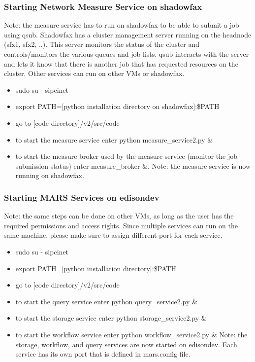 \subsubsection{Starting Network Measure Service on shadowfax}
Note: the measure service has to run on shadowfax to be able to submit a job using qsub. Shadowfax has a cluster management server running on the headnode (sfx1, sfx2, ..). This server monitors the status of the cluster and controls/monitors the various queues and job lists. qsub interacts with the server and lets it know that there is another job that has requested resources on the cluster. Other services can run on other VMs or shadowfax.
\begin{itemize}
\item sudo su - sipcinet
\item export PATH=[python installation directory on shadowfax]:\$PATH
\item go to [code directory]/v2/src/code 
\item to start the measure service enter python measure\_service2.py \&
\item to start the measure broker used by the measure service (monitor the job submission status) enter measure\_broker \&.
Note: the measure service is now running on shadowfax.
 
\end{itemize}


\subsubsection{Starting MARS Services on edisondev}
Note: the same steps can be done on other VMs, as long as the user has the required permissions and access rights. Since multiple services can run on the same machine, please make sure to assign different port for each service. 
\begin{itemize}
\item sudo su - sipcinet
\item export PATH=[python installation directory]:\$PATH
\item go to [code directory]/v2/src/code
\item to start the query service enter python query\_service2.py \&
\item to start the storage service enter python storage\_service2.py \&
\item to start the workflow service enter python workflow\_service2.py \&
Note: the storage, workflow, and query services are now started on edisondev. Each service has its own port that is defined in mars.config file.
\end{itemize}







